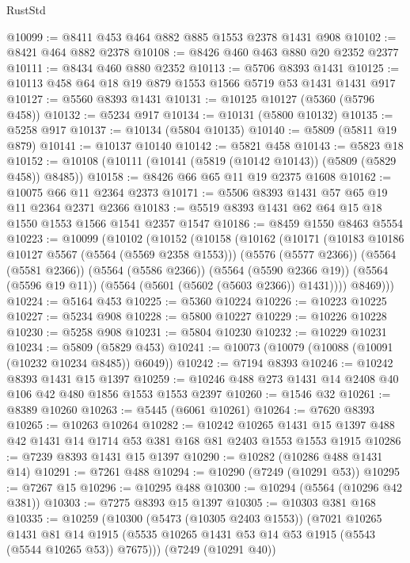 \begin{lexlean}{RustStd}
\begin{coremodule}
@10099 := @8411 @453 @464 @882 @885 @1553 @2378 @1431 @908
@10102 := @8421 @464 @882 @2378
@10108 := @8426 @460 @463 @880 @20 @2352 @2377
@10111 := @8434 @460 @880 @2352
@10113 := @5706 @8393 @1431
@10125 := @10113 @458 @64 @18 @19 @879 @1553 @1566 @5719 @53 @1431 @1431 @917
@10127 := @5560 @8393 @1431
@10131 := @10125 @10127 (@5360 (@5796 @458))
@10132 := @5234 @917
@10134 := @10131 (@5800 @10132)
@10135 := @5258 @917
@10137 := @10134 (@5804 @10135)
@10140 := @5809 (@5811 @19 @879)
@10141 := @10137 @10140
@10142 := @5821 @458
@10143 := @5823 @18
@10152 := @10108 (@10111 (@10141 (@5819 (@10142 @10143)) (@5809 (@5829 @458)) @8485))
@10158 := @8426 @66 @65 @11 @19 @2375 @1608
@10162 := @10075 @66 @11 @2364 @2373
@10171 := @5506 @8393 @1431 @57 @65 @19 @11 @2364 @2371 @2366
@10183 := @5519 @8393 @1431 @62 @64 @15 @18 @1550 @1553 @1566 @1541 @2357 @1547
@10186 := @8459 @1550 @8463 @5554
@10223 := @10099
    (@10102
      (@10152
        (@10158
          (@10162
            (@10171
              (@10183 @10186 @10127 @5567 (@5564 (@5569 @2358 @1553)))
              (@5576 (@5577 @2366))
              (@5564 (@5581 @2366))
              (@5564 (@5586 @2366))
              (@5564 (@5590 @2366 @19))
              (@5564 (@5596 @19 @11))
              (@5564 (@5601 (@5602 (@5603 @2366)) @1431))))
          @8469)))
@10224 := @5164 @453
@10225 := @5360 @10224
@10226 := @10223 @10225
@10227 := @5234 @908
@10228 := @5800 @10227
@10229 := @10226 @10228
@10230 := @5258 @908
@10231 := @5804 @10230
@10232 := @10229 @10231
@10234 := @5809 (@5829 @453)
@10241 := @10073 (@10079 (@10088 (@10091 (@10232 @10234 @8485)) @6049))
@10242 := @7194 @8393
@10246 := @10242 @8393 @1431 @15 @1397
@10259 := @10246 @488 @273 @1431 @14 @2408 @40 @106 @42 @480 @1856 @1553 @1553 @2397
@10260 := @1546 @32
@10261 := @8389 @10260
@10263 := @5445 (@6061 @10261)
@10264 := @7620 @8393
@10265 := @10263 @10264
@10282 := @10242
    @10265
    @1431
    @15
    @1397
    @488
    @42
    @1431
    @14
    @1714
    @53
    @381
    @168
    @81
    @2403
    @1553
    @1553
    @1915
@10286 := @7239 @8393 @1431 @15 @1397
@10290 := @10282 (@10286 @488 @1431 @14)
@10291 := @7261 @488
@10294 := @10290 (@7249 (@10291 @53))
@10295 := @7267 @15
@10296 := @10295 @488
@10300 := @10294 (@5564 (@10296 @42 @381))
@10303 := @7275 @8393 @15 @1397
@10305 := @10303 @381 @168
@10335 := @10259
    (@10300
      (@5473 (@10305 @2403 @1553))
      (@7021
        @10265
        @1431
        @81
        @14
        @1915
        (@5535 @10265 @1431 @53 @14 @53 @1915 (@5543 (@5544 @10265 @53)) @7675)))
    (@7249 (@10291 @40))

\end{coremodule}
\end{lexlean}
